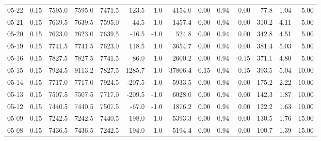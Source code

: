 \begin{threeparttable}
{\begin{tabular}{lrrrrrrrrrrrrr}
  05-22 &     0.15 & 7595.0 & 7595.0 & 7471.5 &      123.5 &                      1.0 &              4154.0 &       0.00 &      0.94 &           0.00 &             77.8 &            1.04 &                   5.00 \\
  05-21 &     0.15 & 7639.5 & 7639.5 & 7595.0 &       44.5 &                      1.0 &              1457.4 &       0.00 &      0.94 &           0.00 &            310.2 &            4.11 &                   5.00 \\
  05-20 &     0.15 & 7623.0 & 7623.0 & 7639.5 &      -16.5 &                     -1.0 &               524.8 &       0.00 &      0.94 &           0.00 &            342.8 &            4.51 &                   5.00 \\
  05-19 &     0.15 & 7741.5 & 7741.5 & 7623.0 &      118.5 &                      1.0 &              3654.7 &       0.00 &      0.94 &           0.00 &            381.4 &            5.03 &                   5.00 \\
  05-16 &     0.15 & 7827.5 & 7827.5 & 7741.5 &       86.0 &                      1.0 &              2600.2 &       0.00 &      0.94 &          -0.15 &            371.1 &            4.80 &                   5.00 \\
  05-15 &     0.15 & 7924.5 & 9113.2 & 7827.5 &     1285.7 &                      1.0 &             37806.4 &       0.15 &      0.94 &           0.15 &            393.5 &            5.04 &                  10.00 \\
  05-14 &     0.15 & 7717.0 & 7717.0 & 7924.5 &     -207.5 &                     -1.0 &              5933.5 &       0.00 &      0.94 &           0.00 &            175.2 &            2.22 &                  10.00 \\
  05-13 &     0.15 & 7507.5 & 7507.5 & 7717.0 &     -209.5 &                     -1.0 &              6028.0 &       0.00 &      0.94 &           0.00 &            142.3 &            1.87 &                  10.00 \\
  05-12 &     0.15 & 7440.5 & 7440.5 & 7507.5 &      -67.0 &                     -1.0 &              1876.2 &       0.00 &      0.94 &           0.00 &            122.2 &            1.63 &                  10.00 \\
  05-09 &     0.15 & 7242.5 & 7242.5 & 7440.5 &     -198.0 &                     -1.0 &              5393.3 &       0.00 &      0.94 &           0.00 &            130.5 &            1.76 &                  15.00 \\
  05-08 &     0.15 & 7436.5 & 7436.5 & 7242.5 &      194.0 &                      1.0 &              5194.4 &       0.00 &      0.94 &           0.00 &            100.7 &            1.39 &                  15.00 \\

\end{tabular}}
\end{threeparttable}
